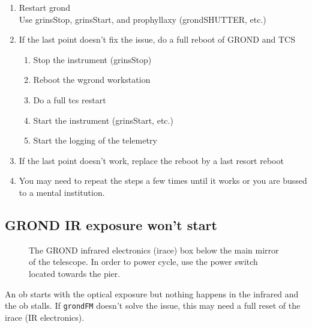 \documentclass[11pt,fleqn,a4paper]{book}
\begin{document}
\label{proc:TELESCOPkeyword}
\begin{enumerate}
\item Restart \gls{grond}\\
      Use \gls{grinsStop}, \gls{grinsStart}, and prophyllaxy (\gls{grondSHUTTER}, etc.)
\item If the last point doesn't fix the issue, do a full reboot of GROND and TCS
    \begin{enumerate}
        \item Stop the instrument (\gls{grinsStop})
        \item Reboot the \gls{wgrond} workstation
        \item Do a full \gls{tcs} restart
        \item Start the instrument (\gls{grinsStart}, etc.)
        \item Start the logging of the telemetry
    \end{enumerate}
\item If the last point doesn't work, replace the reboot by a last resort reboot\item You may need to repeat the steps a few times until it works or you are bussed to a mental institution.
\end{enumerate}

\subsection{GROND IR exposure won't start}

\begin{figure}
\centering
{}%
\hspace{0.01\linewidth}%
%
\caption[The GROND IRACE box]{The GROND infrared electronics (\gls{irace}) box below the \gls{main mirror} of the telescope. In order to \gls{power cycle}, use the power switch located towards the pier.}
\label{fig:grond-irace}
\end{figure}

An \gls{ob} starts with the optical exposure but nothing happens in the infrared and
the \gls{ob} \gls{stall}s. If \texttt{grondFM} doesn't solve the issue, this may need a full reset of the \gls{irace} (IR electronics).
 
\end{document}
